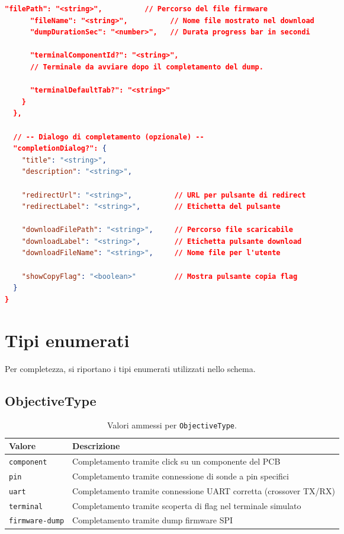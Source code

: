 \begin{lstlisting}[language=json]
      "filePath": "<string>",          // Percorso del file firmware
      "fileName": "<string>",          // Nome file mostrato nel download
      "dumpDurationSec": "<number>",   // Durata progress bar in secondi

      "terminalComponentId?": "<string>",
      // Terminale da avviare dopo il completamento del dump.

      "terminalDefaultTab?": "<string>"
    }
  },

  // -- Dialogo di completamento (opzionale) --
  "completionDialog?": {
    "title": "<string>",
    "description": "<string>",

    "redirectUrl": "<string>",          // URL per pulsante di redirect
    "redirectLabel": "<string>",        // Etichetta del pulsante

    "downloadFilePath": "<string>",     // Percorso file scaricabile
    "downloadLabel": "<string>",        // Etichetta pulsante download
    "downloadFileName": "<string>",     // Nome file per l'utente

    "showCopyFlag": "<boolean>"         // Mostra pulsante copia flag
  }
}
\end{lstlisting}


\section{Tipi enumerati}

Per completezza, si riportano i tipi enumerati utilizzati nello schema.

\subsection{ObjectiveType}

\begin{table}[H]
\centering
\begin{tabularx}{\textwidth}{lX}
\toprule
\textbf{Valore} & \textbf{Descrizione} \\
\midrule
\texttt{component} & Completamento tramite click su un componente del PCB \\
\texttt{pin} & Completamento tramite connessione di sonde a pin specifici \\
\texttt{uart} & Completamento tramite connessione UART corretta (crossover TX/RX) \\
\texttt{terminal} & Completamento tramite scoperta di flag nel terminale simulato \\
\texttt{firmware-dump} & Completamento tramite dump firmware SPI \\
\bottomrule
\end{tabularx}
\caption{Valori ammessi per \texttt{ObjectiveType}.}
\label{tab:objective-type}
\end{table}

